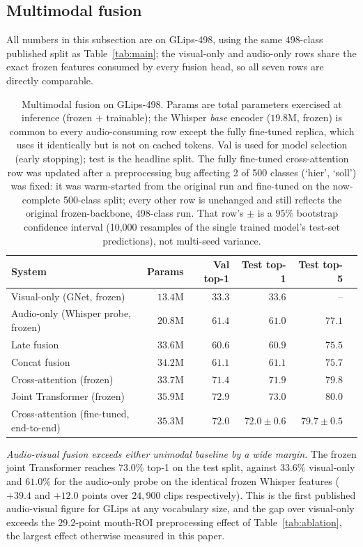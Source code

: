 \documentclass[10pt, a4paper]{article}
\begin{document}
\subsection{Multimodal fusion}
\label{sec:mm-results}
\noindent All numbers in this subsection are on GLips-498, using the same $498$-class published split as Table~\ref{tab:main}; the visual-only and audio-only rows share the exact frozen features consumed by every fusion head, so all seven rows are directly comparable.
\begin{table}[!htb]
\centering
\caption{Multimodal fusion on GLips-498. Params are total parameters exercised at inference (frozen $+$ trainable); the Whisper \emph{base} encoder ($19.8$M, frozen) is common to every audio-consuming row except the fully fine-tuned replica, which uses it identically but is not on cached tokens. Val is used for model selection (early stopping); test is the headline split. The fully fine-tuned cross-attention row was updated after a preprocessing bug affecting 2 of 500 classes (`hier', `soll') was fixed: it was warm-started from the original run and fine-tuned on the now-complete 500-class split; every other row is unchanged and still reflects the original frozen-backbone, 498-class run. That row's $\pm$ is a $95\%$ bootstrap confidence interval (10{,}000 resamples of the single trained model's test-set predictions), not multi-seed variance.}
\label{tab:mm}
\begin{tabular}{@{}lrrrrr@{}}
\toprule
System & Params & Val top-1 & Test top-1 & Test top-5 \\
\midrule
Visual-only (GNet, frozen)     & $13.4$M & $33.3$ & $33.6$ & -- \\
Audio-only (Whisper probe, frozen) & $20.8$M & $61.4$ & $61.0$ & $77.1$ \\
Late fusion                    & $33.6$M & $60.6$ & $60.9$ & $75.5$ \\
Concat fusion                  & $34.2$M & $61.1$ & $61.1$ & $75.7$ \\
Cross-attention (frozen)       & $33.7$M & $71.4$ & $71.9$ & $79.8$ \\
Joint Transformer (frozen)     & $35.9$M & $\mathbf{72.9}$ & $\mathbf{73.0}$ & $\mathbf{80.0}$ \\
\addlinespace
Cross-attention (fine-tuned, end-to-end) & $35.3$M & $72.0$ & $72.0 \pm 0.6$ & $79.7 \pm 0.5$ \\
\bottomrule
\end{tabular}
\end{table}
\noindent\emph{Audio-visual fusion exceeds either unimodal baseline by a wide margin.} The frozen joint Transformer reaches $73.0\%$ top-1 on the test split, against $33.6\%$ visual-only and $61.0\%$ for the audio-only probe on the identical frozen Whisper features ($+39.4$ and $+12.0$ points over $24{,}900$ clips respectively). This is the first published audio-visual figure for GLips at any vocabulary size, and the gap over visual-only exceeds the $29.2$-point mouth-ROI preprocessing effect of Table~\ref{tab:ablation}, the largest effect otherwise measured in this paper.
\end{document}
